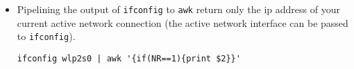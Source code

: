 \documentclass{article}
\begin{document}
\begin{itemize}
AQ: value Temp: value $\rm^\circ C$ (e.g. AQ: 55 Temp: 24 $\rm^\circ C$).

\begin{verbatim}
curl --silent 'http://aqicn.org/?city=Shanghai&widgetscript&size=large' \
| sed ':t;N;s/\n//;b t' \
| sed 's/\([^\n]\+\)\\\">/AQ: /g' \
| sed "s/<\/div>\([^\n]\+\)10px;'>/ Temp: /g" \
| sed 's/<\/td>\([^\n]\+\)//g' \
&& echo -e '\u00B0C'
\end{verbatim}

\item Pipelining the output of \texttt{ifconfig} to \texttt{awk} return only the ip address of your current active network connection (the active network interface can be passed to \texttt{ifconfig}).

\begin{verbatim}
ifconfig wlp2s0 | awk '{if(NR==1){print $2}}'
\end{verbatim}

\end{itemize}
\end{document}
